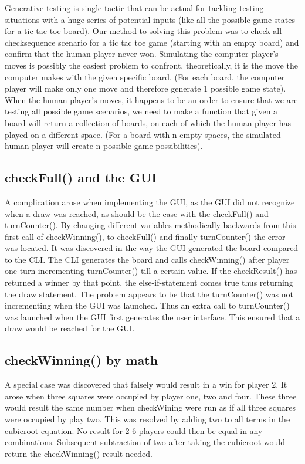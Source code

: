 \documentclass[a4paper,10pt]{article}
\begin{document}
	Generative testing is single tactic that can be actual for tackling testing situations with a huge series of potential inputs (like all the possible game states for a tic tac toe board).
	Our method to solving this problem was to check all checksequence scenario for a tic tac toe game (starting with an empty board) and confirm that the human player never won.
	Simulating the computer player’s moves is possibly the easiest problem to confront, theoretically, it is the move the computer makes with the given specific board. (For each board, the computer player will make only one move and therefore generate 1 possible game state).
	When the human player’s moves, it happens to be an order to ensure that we are testing all possible game scenarios, we need to make a function that given a board will return a collection of boards, on each of which the human player has played on a different space. (For a board with n empty spaces, the simulated human player will create n possible game possibilities).
	
	\subsection{checkFull() and the GUI}
	A complication arose when implementing the GUI, as the GUI did not recognize when a draw was reached, as should be the case with the checkFull() and turnCounter(). By changing different variables methodically backwards from this first call of checkWinning(), to checkFull() and finally turnCounter() the error was located. It was discovered in the way the GUI generated the board compared to the CLI.  The CLI generates the board and calls checkWinning() after player one turn incrementing turnCounter() till a certain value. If the checkResult() has returned a winner by that point, the else-if-statement comes true thus returning the draw statement.  
	The problem appears to be that the turnCounter() was not incrementing when the GUI was launched. Thus an extra call to turnCounter() was launched when the GUI first generates the user interface. This ensured that a draw would be reached for the GUI.
	
	\subsection{checkWinning() by math}
	A special case was discovered that falsely would result in a win for player 2. It arose when three squares were occupied by player one, two and four. These three would result the same number when checkWining were run as if all three squares were occupied by play two.
	This was resolved by adding two to all terms in the cubicroot equation. No result for 2-6 players could then be equal in any combinations. Subsequent subtraction of two after taking the cubicroot would return the checkWinning() result needed.
	
\end{document}
